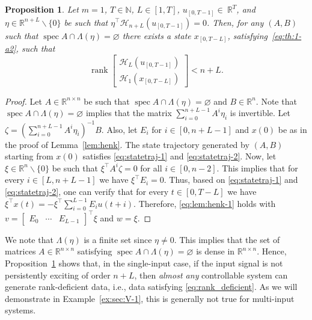 \documentclass[journal,twoside,web]{ieeecolor}
\newtheorem{proposition}[theorem]{Proposition}
\DeclareMathOperator{\rank}{rank}
\DeclareMathOperator{\spec}{spec}
\begin{document}
\begin{proposition}
\label{prop:m1}
Let $m=1$, $T\in\mathbb{N}$, $L\in[1,T]$, $u_{[0,T-1]}\in~\mathbb{R}^{T}$, and $\eta\in\mathbb{R}^{n+L}\backslash\{0\}$ be such that $\eta^\top \mathcal{H}_{n+L}(u_{[0,T-1]})=0$. Then, for any $(A,B)$ such that $\spec A\cap\Lambda(\eta)=\varnothing$ there exists a state $x_{[0,T-L]}$, satisfying~\eqref{eq:th:1-a2}, such that
\begin{equation}
\label{eq:rank_deficient}
\rank \begin{bmatrix}
\mathcal{H}_L(u_{[0,T-1]}) \\
\mathcal{H}_1(x_{[0,T-L]}) 
\end{bmatrix}<n+L.
\end{equation}
\end{proposition}\vspace{0.25 cm}
\begin{proof}
Let $A\in\mathbb{R}^{n\times n}$ be such that $\spec A\cap\Lambda(\eta)=\varnothing$ and $B\in\mathbb{R}^{n}$. Note that $\spec A\cap\Lambda(\eta)=\varnothing$ implies that the matrix $\sum_{i=0}^{n+L-1} A^i\eta_i$ is invertible. Let $\zeta=(\sum_{i=0}^{n+L-1} A^i\eta_i)^{-1}B$. Also, let $E_i$ for $i\in[0,n+L-1]$ and $x(0)$ be as in the proof of Lemma~\ref{lem:henk}. The state trajectory generated by $(A,B)$ starting from $x(0)$ satisfies \eqref{eq:statetraj-1} and \eqref{eq:statetraj-2}. Now, let $\xi\in\mathbb{R}^n\backslash\{0\}$ be such that $\xi^\top A^i \zeta=0$ for all $i\in[0,n-2]$. This implies that for every $i\in[L,n+L-1]$ we have $\xi^\top E_i=0$. Thus, based on \eqref{eq:statetraj-1} and \eqref{eq:statetraj-2}, one can verify that for every $t\in[0,T-L]$ we have $\xi^\top x(t)=-\xi^\top \sum_{i=0}^{L-1} E_i u(t+i)$. Therefore, \eqref{eq:lem:henk-1} holds with $v=\begin{bmatrix}
E_0 & \cdots & E_{L-1}
\end{bmatrix}^\top \xi$ and $w=\xi$.
\end{proof}

We note that $\Lambda(\eta)$ is a finite set since $\eta\neq 0$. This implies that the set of matrices $A\in\mathbb{R}^{n\times n}$ satisfying \linebreak $\spec A\cap\Lambda(\eta)=\varnothing$ is dense in $\mathbb{R}^{n\times n}$. Hence, Proposition~\ref{prop:m1} shows that, in the single-input case, if the input signal is not persistently exciting of order $n+L$, then \emph{almost any} controllable system can generate rank-deficient data, i.e., data satisfying \eqref{eq:rank_deficient}. As we will demonstrate in Example~\ref{ex:sec:V-1}, this is generally not true for multi-input systems. 
\end{document}
